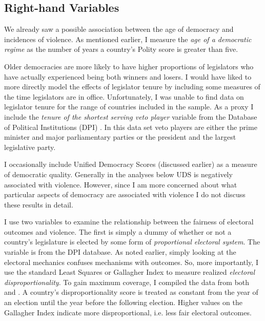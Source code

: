\documentclass[a4paper]{article}\usepackage{graphicx, color}
\begin{document}
\subsection{Right-hand Variables}

We already saw a possible association between the age of democracy and incidences of violence. As mentioned earlier, I measure the {\emph{age of a democratic regime}} as the number of years a country's Polity score is greater than five.

Older democracies are more likely to have higher proportions of legislators who have actually experienced being both winners and losers. I would have liked to more directly model the effects of legislator tenure by including some measures of the time legislators are in office. Unfortunately, I was unable to find data on legislator tenure for the range of countries included in the sample. As a proxy I include the {\emph{tenure of the shortest serving veto player}} variable from the Database of Political Institutions (DPI) \citep[updated to 2010]{DPI2001}. In this data set veto players are either the prime minister and major parliamentary parties or the president and the largest legislative party.

I occasionally include Unified Democracy Scores (discussed earlier) as a measure of democratic quality. Generally in the analyses below UDS is negatively associated with violence. However, since I am more concerned about what particular aspects of democracy are associated with violence I do not discuss these results in detail.

I use two variables to examine the relationship between the fairness of electoral outcomes and violence. The first is simply a dummy of whether or not a country's legislature is elected by some form of {\emph{proportional electoral system}}. The variable is from the DPI database. As noted earlier, simply looking at the electoral mechanics confuses mechanisms with outcomes. So, more importantly, I use the standard Least Squares or Gallagher Index \citep[see][]{Gallagher1991} to measure realized {\emph{electoral disproportionality}}. To gain maximum coverage, I compiled the data from both \cite{Gallagher2012} and \cite{Carey2011}. A country's disproportionality score is treated as constant from the year of an election until the year before the following election. Higher values on the Gallagher Index indicate more disproportional, i.e. less fair electoral outcomes.
\end{document}
